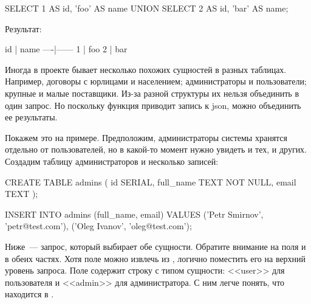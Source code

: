 \begin{english}
  \begin{sql}
SELECT
  1 AS id, 'foo' AS name
UNION
SELECT
  2 AS id, 'bar' AS name;
  \end{sql}
\end{english}

Результат:


\begin{english}
  \begin{text}
 id | name
----|------
  1 | foo
  2 | bar
  \end{text}
\end{english}

Иногда в проекте бывает несколько похожих сущностей в разных таблицах. Например, договоры с юрлицами и населением; администраторы и пользователи; крупные и малые поставщики. Из-за разной структуры их нельзя объединить в один запрос. Но поскольку функция  приводит запись к json, можно объединить ее результаты.

Покажем это на примере. Предположим, администраторы системы хранятся отдельно от пользователей, но в какой-то момент нужно увидеть и тех, и других. Создадим таблицу администраторов и несколько записей:

\begin{english}
  \begin{sql}
CREATE TABLE admins (
  id SERIAL,
  full_name TEXT NOT NULL,
  email TEXT
);

INSERT INTO admins (full_name, email)
VALUES ('Petr Smirnov', 'petr@test.com'),
       ('Oleg Ivanov', 'oleg@test.com');
  \end{sql}
\end{english}

Ниже~--- запрос, который выбирает обе сущности. Обратите внимание на поля  и  в обеих частях. Хотя поле  можно извлечь из , логично поместить его на верхний уровень запроса. Поле  содержит строку с типом сущности: <<user>> для пользователя и <<admin>> для администратора. С ним легче понять, что находится в .

